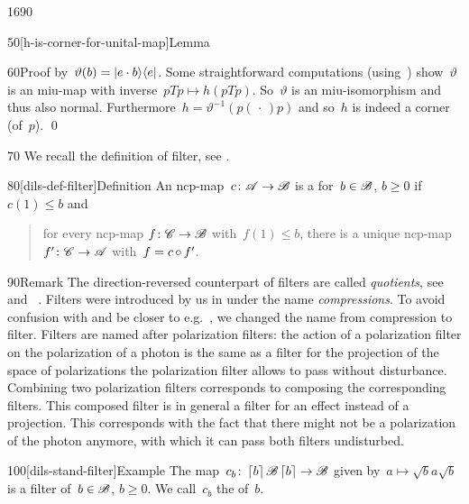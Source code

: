 \begin{parsec}{1690}
\begin{point}{50}[h-is-corner-for-unital-map]{Lemma}
\begin{point}{60}{Proof}
    by~$\vartheta(b) = \left|e \cdot b\right>\!\left<e\right|$.
    Some straightforward computations (using~)
    show~$\vartheta$ is an miu-map
    with inverse~$pTp \mapsto h(pTp)$.
So~$\vartheta$ is an miu-isomorphism and thus also normal.
    Furthermore~$h = \vartheta^{-1}(p (\,\cdot\,) p)$
     and so~$h$ is indeed a corner (of~$p$). \qed
\end{point}
\end{point}
\begin{point}{70}%
We recall the definition of filter, see . 
\end{point}
\begin{point}{80}[dils-def-filter]{Definition}%
An ncp-map~$c \colon \mathscr{A} \to \mathscr{B}$
is a  for~$b \in\mathscr{B}$, $b \geq 0$ if~$c(1)\leq b$
    and
    \begin{quote}
        for every ncp-map $f\colon \mathscr{C} \to \mathscr{B}$
            with~$f(1) \leq b$,
            there is a unique ncp-map~$f'\colon \mathscr{C} \to \mathscr{A}$
            with~$f = c \mathop{\circ} f'$.
    \end{quote}
\spacingfix{}
\begin{point}{90}{Remark}%
The direction-reversed counterpart
    of filters are called \emph{quotients},
    see~ and~\cite{effintro} .
Filters were introduced by us in \cite[dfn.~2]{westerbaan2016universal}
    under the name \emph{compressions}.
To avoid confusion with \cite{alfsen2012}
    and be closer to e.g.~\cite{wilce2016royal},
    we changed the name from compression to filter.
Filters are named after polarization filters:
    the action of a polarization filter on the polarization
        of a photon is the same as a filter for
        the projection of the space of polarizations
        the polarization filter allows to pass without disturbance.
Combining two polarization filters corresponds
    to composing the corresponding filters.
This composed filter is in general a filter for an effect instead
    of a projection.
This corresponds with the fact that there might not be a polarization
    of the photon anymore,
    with which it can pass both filters undisturbed.
\end{point}
\end{point}
\begin{point}{100}[dils-stand-filter]{Example}%
    The map~$c_b\colon \left\lceil b\right\rceil \mathscr{B}\left\lceil b\right\rceil \to \mathscr{B} $
        given by~$a \mapsto \sqrt{b} a \sqrt{b}$ is a filter
        of~$b\in \mathscr{B}$, $b\geq 0$.
        We call~$c_b$ the  of~$b$.

\end{point}
\end{parsec}

